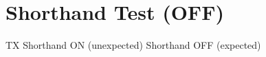 \documentclass{article}
\begin{document}
\section*{Shorthand Test (OFF)}

\ifcsname TX\endcsname
Shorthand ON (unexpected)
\else
Shorthand OFF (expected)
\fi
\end{document}

